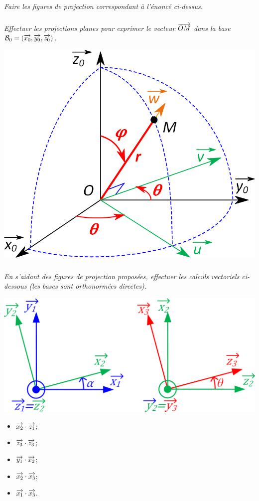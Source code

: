 \documentclass[10pt]{article}
\begin{document}
\subparagraph{}
\textit{Faire les figures de projection correspondant à l’énoncé ci-dessus.}

\subparagraph{}
\textit{Effectuer les projections planes pour exprimer le vecteur $\overrightarrow{OM}$ dans la base $\mathcal{B}_0=\left(\overrightarrow{x_0},\overrightarrow{y_0}, \overrightarrow{z_0}\right)$.}
\begin{center}
\includegraphics[width=.4\textwidth]{images/fig_02}
\end{center}

\subparagraph{}
\textit{En s’aidant des figures de projection proposées, effectuer les calculs vectoriels ci-dessous (les bases sont orthonormées directes).}
\begin{center}
\includegraphics[width=.5\textwidth]{images/fig_03}
\end{center}

\begin{itemize}
\item $\overrightarrow{x_2} \cdot \overrightarrow{z_1}$;
\item $\overrightarrow{z_3} \cdot \overrightarrow{z_3}$;
\item $\overrightarrow{y_1} \cdot \overrightarrow{x_2}$;
\item $\overrightarrow{x_2} \cdot \overrightarrow{x_3}$;
\item $\overrightarrow{x_1} \cdot \overrightarrow{x_3}$.
\end{itemize}
\end{document}
